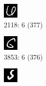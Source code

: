 \documentclass[a4paper,12pt,ngerman,oneside]{scrreprt}	%
\begin{document}
		\begin{figure}[h]
			\vspace{0.0cm} \centering
			\begin{subfigure}[t]{.19\linewidth}
				\centering
				\includegraphics[height=0.6\linewidth]{top5FFNN/6-2118.png}
				\caption{2118: 6 (377)}
			\end{subfigure}
			\begin{subfigure}[t]{.19\linewidth}
				\centering
				\includegraphics[height=0.6\linewidth]{top5FFNN/6-3853.png}
				\caption{3853: 6 (376)}
			\end{subfigure}
			\begin{subfigure}[t]{.19\linewidth}
				\centering
				\includegraphics[height=0.6\linewidth]{top5FFNN/5-9982.png}

\end{subfigure}
\end{figure}
\end{document}
